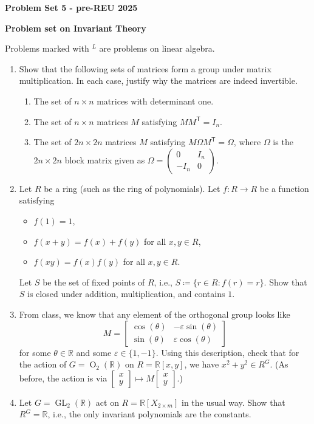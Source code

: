 \documentclass{article}
\DeclareMathOperator{\GL}{GL}
\DeclareMathOperator{\OO}{O}
\newcommand{\trans}{\mathsf{T}}
\newcommand{\smatrix}[1]{\left(\begin{smallmatrix} #1 \end{smallmatrix}\right)}
\begin{document}
\begin{center}
\bf Problem Set 5 - pre-REU 2025
\end{center}

\textbf{Problem set on Invariant Theory}

Problems marked with ${}^{L}$ are problems on linear algebra. 

\begin{enumerate}[label=\arabic*., leftmargin=*]
	\item Show that the following sets of matrices form a group under matrix multiplication. 
	In each case, justify why the matrices are indeed invertible.
	\begin{enumerate}[label=(\alph*)]
		\item The set of $n \times n$ matrices with determinant one. 
		\item The set of $n \times n$ matrices $M$ satisfying 
		$M M^{\trans} = I_{n}$.
		\item The set of $2n \times 2n$ matrices $M$ satisfying 
		$M \Omega M^{\trans} = \Omega$, 
		where $\Omega$ is the $2n \times 2n$ block matrix given as 
		$\Omega = \smatrix{0 & I_{n} \\ -I_{n} & 0}$. 
	\end{enumerate}
	\item Let $R$ be a ring (such as the ring of polynomials). 
	Let $f \colon R \to R$ be a function satisfying 
	\begin{itemize}
		\item $f(1) = 1$, 
		\item $f(x + y) = f(x) + f(y)$ for all $x, y \in R$, 
		\item $f(x y) = f(x) f(y)$ for all $x, y \in R$.
	\end{itemize}
	Let $S$ be the set of fixed points of $R$, i.e., 
	$S \coloneqq \{r \in R : f(r) = r\}$. 
	Show that $S$ is closed under addition, multiplication, and contains $1$. 
	\item From class, we know that any element of the orthogonal group looks like
	\begin{equation*} 
		M = 
		\begin{bmatrix}
			\cos(\theta) & - \varepsilon \sin(\theta) \\
			\sin(\theta) & \varepsilon \cos(\theta)
		\end{bmatrix}
	\end{equation*}
	for some $\theta \in \mathbb{R}$ and some $\varepsilon \in \{1, -1\}$. 
	Using this description, check that for the action of $G = \OO_{2}(\mathbb{R})$ on $R = \mathbb{R}\left[x, y\right]$, 
	we have $x^{2} + y^{2} \in R^{G}$. 
	(As before, the action is via $\left[\begin{smallmatrix} x \\ y\end{smallmatrix}\right] \mapsto M \left[\begin{smallmatrix} x \\ y\end{smallmatrix}\right]$.)
	\item Let $G = \GL_{2}(\mathbb{R})$ act on $R = \mathbb{R}[X_{2 \times m}]$ in the usual way. 
	Show that $R^{G} = \mathbb{R}$, i.e., the only invariant polynomials are the constants. 


\end{enumerate}
\end{document}
